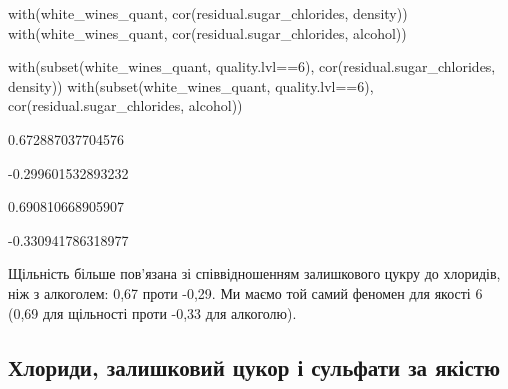 \documentclass[
  letterpaper,
  DIV=11,
  numbers=noendperiod]{scrreprt}
\newenvironment{Shaded}{\begin{snugshade}}{\end{snugshade}}
\newcommand{\AttributeTok}[1]{\textcolor[rgb]{0.40,0.45,0.13}{#1}}
\newcommand{\CommentTok}[1]{\textcolor[rgb]{0.37,0.37,0.37}{#1}}
\newcommand{\DecValTok}[1]{\textcolor[rgb]{0.68,0.00,0.00}{#1}}
\newcommand{\FloatTok}[1]{\textcolor[rgb]{0.68,0.00,0.00}{#1}}
\newcommand{\FunctionTok}[1]{\textcolor[rgb]{0.28,0.35,0.67}{#1}}
\newcommand{\NormalTok}[1]{\textcolor[rgb]{0.00,0.23,0.31}{#1}}
\newcommand{\SpecialCharTok}[1]{\textcolor[rgb]{0.37,0.37,0.37}{#1}}
\newcommand{\StringTok}[1]{\textcolor[rgb]{0.13,0.47,0.30}{#1}}
\begin{document}
\begin{Shaded}
\begin{Highlighting}[]
\FunctionTok{with}\NormalTok{(white\_wines\_quant, }\FunctionTok{cor}\NormalTok{(residual.sugar\_chlorides, density))}
\FunctionTok{with}\NormalTok{(white\_wines\_quant, }\FunctionTok{cor}\NormalTok{(residual.sugar\_chlorides, alcohol))}

\FunctionTok{with}\NormalTok{(}\FunctionTok{subset}\NormalTok{(white\_wines\_quant, quality.lvl}\SpecialCharTok{==}\DecValTok{6}\NormalTok{),}
     \FunctionTok{cor}\NormalTok{(residual.sugar\_chlorides, density))}
\FunctionTok{with}\NormalTok{(}\FunctionTok{subset}\NormalTok{(white\_wines\_quant, quality.lvl}\SpecialCharTok{==}\DecValTok{6}\NormalTok{),}
     \FunctionTok{cor}\NormalTok{(residual.sugar\_chlorides, alcohol))}
\end{Highlighting}
\end{Shaded}

0.672887037704576

-0.299601532893232

0.690810668905907

-0.330941786318977

Щільність більше пов'язана зі співвідношенням залишкового цукру до
хлоридів, ніж з алкоголем: 0,67 проти -0,29. Ми маємо той самий феномен
для якості 6 (0,69 для щільності проти -0,33 для алкоголю).

\subsection{Хлориди, залишковий цукор і сульфати за
якістю}\label{ux445ux43bux43eux440ux438ux434ux438-ux437ux430ux43bux438ux448ux43aux43eux432ux438ux439-ux446ux443ux43aux43eux440-ux456-ux441ux443ux43bux44cux444ux430ux442ux438-ux437ux430-ux44fux43aux456ux441ux442ux44e-1}

\begin{Shaded}
\end{Shaded}
\end{document}
